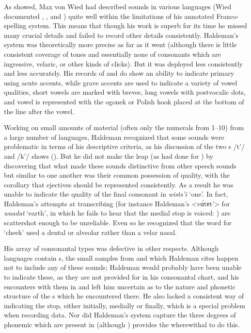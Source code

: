 \documentclass[output=paper]{LSP/langsci}
\begin{document}
As \citet{Rankin1994} showed, Max von Wied \citep{Maximilian18391841} had described sounds in various  languages (Wied documented , ,  and ) quite well within the limitations of his annotated Franco- spelling system. This means that though his work is superb for its time he missed many crucial details and failed to record other details consistently.   Haldeman's system was theoretically more precise as far as it went (although there is little consistent coverage of tones and essentially none of consonants which are ingressive, velaric, or other kinds of clicks). But it was deployed less consistently and less accurately.   His records of  and  do show an ability to indicate primary  using acute accents, while grave accents are used to indicate a variety of vowel qualities, short vowels are marked with breves, long vowels with postvocalic dots, and vowel  is represented with the ogonek or Polish hook placed at the bottom of the line after the vowel.  
 

Working on small amounts of material (often only the numerals from 1--10) from a large number of languages, Haldeman recognized that some sounds were problematic in terms of his descriptive criteria, as his discussion of the two s   /t'/ and  /k'/ shows (\citealt[99: \S448; 131: \S574]{Haldeman1860}).  But he did not make the leap (as \citealt{Garcia1760} had done for ) by discovering that what made these sounds distinctive from other speech sounds but similar to one another was their common possession of  quality, with the corollary that ejectives should be represented consistently.  As a result he was unable to indicate the  quality of the final consonant in  \textit{wists'i} `one'.  In fact, Haldeman's attempts at transcribing  (for instance Haldeman's <v\'{ɑ}tɐt'> for \textit{waadat} `earth', in which he fails to hear that the medial stop is voiced: \citealt[135, \S633]{Haldeman1860}) are scattershot enough to be unreliable. Even so he recognized that the  word for `cheek'  used a dental or alveolar rather than a velar nasal.    

 
His array of consonantal types was defective in other respects. Although  languages contain s, the small samples from  and  which Haldeman cites happen not to include any of these sounds; Haldeman would probably have been unable to indicate these, as they are not provided for in his consonantal chart, and his encounters with them in  and  left him uncertain as to the nature and phonetic structure of the s which he encountered there.  He also lacked a consistent way of indicating the  stop, either initially, medially or finally, which is a special problem when recording  data. Nor did Haldeman's system capture the three degrees of phonemic  which are present in  (although \citealt[80, \S353--355]{Haldeman1860}) provides the wherewithal to do this.  
 
\end{document}
